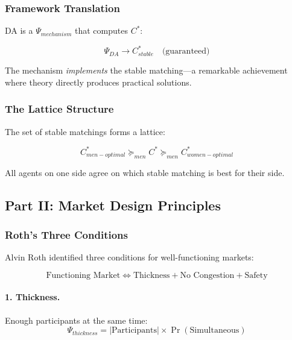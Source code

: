\subsubsection{Framework Translation}

DA is a $\Psi_{mechanism}$ that computes $C^*$:

\begin{equation}
\Psi_{DA} \to C^*_{stable} \quad \text{(guaranteed)}
\end{equation}

The mechanism \textit{implements} the stable matching---a remarkable 
achievement where theory directly produces practical solutions.

\subsubsection{The Lattice Structure}

The set of stable matchings forms a lattice:

\begin{equation}
C^*_{men-optimal} \succeq_{men} C^* \succeq_{men} C^*_{women-optimal}
\end{equation}

All agents on one side agree on which stable matching is best for their side.

\subsection{Part II: Market Design Principles}

\subsubsection{Roth's Three Conditions}

Alvin Roth identified three conditions for well-functioning markets:

\begin{equation}
\boxed{
\text{Functioning Market} \Leftrightarrow \text{Thickness} + \text{No Congestion} + \text{Safety}
}
\label{eq:roth-three}
\end{equation}

\paragraph{1. Thickness.}
Enough participants at the same time:
\begin{equation}
\Psi_{thickness} = |\text{Participants}| \times \Pr(\text{Simultaneous})
\end{equation}

